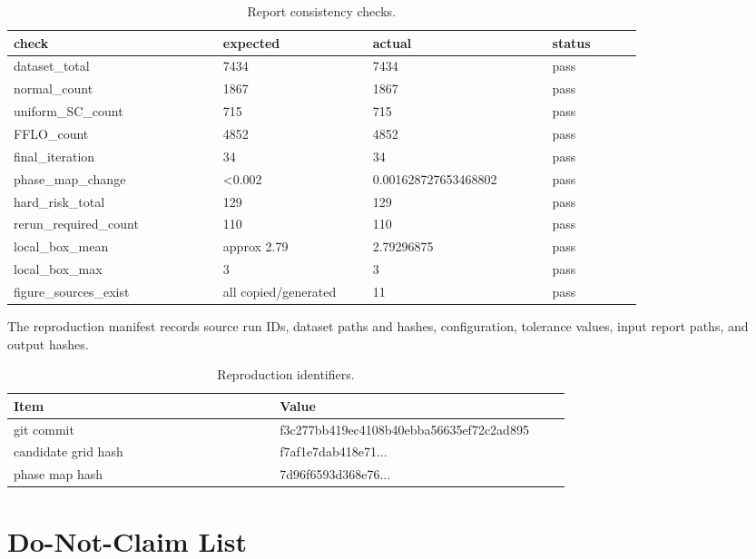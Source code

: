 \documentclass[11pt]{article}
\begin{document}
\begin{table}[H]
\centering
\small
\begin{tabular}{@{}p{0.28\linewidth}p{0.20\linewidth}p{0.24\linewidth}p{0.12\linewidth}@{}}
\toprule
check & expected & actual & status \\
\midrule
dataset\_total & 7434 & 7434 & pass \\
normal\_count & 1867 & 1867 & pass \\
uniform\_SC\_count & 715 & 715 & pass \\
FFLO\_count & 4852 & 4852 & pass \\
final\_iteration & 34 & 34 & pass \\
phase\_map\_change & <0.002 & 0.001628727653468802 & pass \\
hard\_risk\_total & 129 & 129 & pass \\
rerun\_required\_count & 110 & 110 & pass \\
local\_box\_mean & approx 2.79 & 2.79296875 & pass \\
local\_box\_max & 3 & 3 & pass \\
figure\_sources\_exist & all copied/generated & 11 & pass \\
\bottomrule
\end{tabular}
\caption{Report consistency checks.}
\end{table}

The reproduction manifest records source run IDs, dataset paths and hashes, configuration, tolerance values, input report paths, and output hashes.

\begin{table}[H]
\centering
\small
\begin{tabular}{@{}p{0.43\linewidth}p{0.47\linewidth}@{}}
\toprule
Item & Value \\
\midrule
git commit & f3c277bb419ec4108b40ebba56635ef72c2ad895 \\
candidate grid hash & f7af1e7dab418e71... \\
phase map hash & 7d96f6593d368e76... \\
\bottomrule
\end{tabular}
\caption{Reproduction identifiers.}
\end{table}

\section{Do-Not-Claim List}
\end{document}
